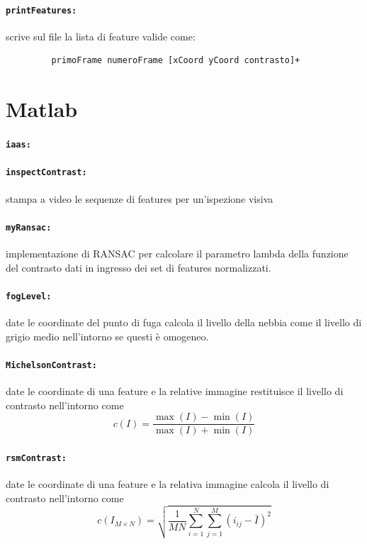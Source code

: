 \documentclass[12pt]{report}
\begin{document}
\paragraph*{\verb_printFeatures:_} scrive sul file la lista di feature valide come:
\begin{verbatim}
	     primoFrame numeroFrame [xCoord yCoord contrasto]+
\end{verbatim}

\section{Matlab}

\paragraph*{\verb_iaas:_}

\paragraph*{\verb_inspectContrast:_} stampa a video le sequenze di features per un'ispezione visiva

\paragraph*{\verb_myRansac:_} implementazione di RANSAC per calcolare il parametro lambda della funzione del contrasto dati in ingresso dei set di features normalizzati.






\paragraph*{\verb_fogLevel:_} date le coordinate del punto di fuga calcola il livello della nebbia come il livello di grigio medio nell'intorno se questi \`e omogeneo.

\paragraph*{\verb_MichelsonContrast:_} date le coordinate di una feature e la relative immagine restituisce il livello di contrasto nell'intorno come $$c\left(I\right) = \frac{\max(I)-\min(I)}{\max(I)+\min(I)}$$

\paragraph*{\verb_rsmContrast:_} date le coordinate di una feature e la relativa immagine calcola il livello di contrasto nell'intorno come $$ c\left(I_{M\times N}\right) = \sqrt{\frac{1}{MN}\sum_{i=1}^N\sum_{j=1}^M(i_{ij}-\bar{I})^2} $$
\end{document}
